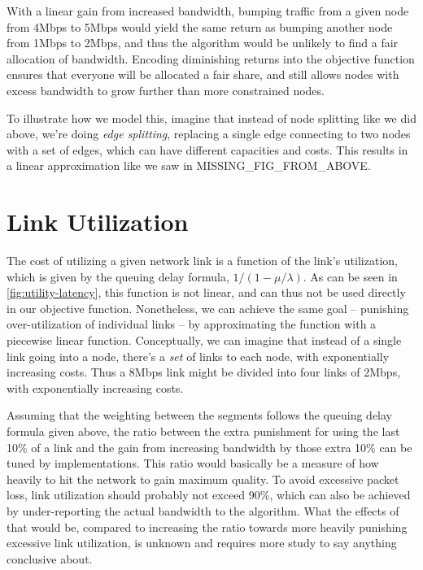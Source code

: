 With a linear gain from increased bandwidth, bumping traffic from a given node from 4Mbps to 5Mbps would yield the same return as bumping another node from 1Mbps to 2Mbps, and thus the algorithm would be unlikely to find a fair allocation of bandwidth. Encoding diminishing returns into the objective function ensures that everyone will be allocated a fair share, and still allows nodes with excess bandwidth to grow further than more constrained nodes.

To illustrate how we model this, imagine that instead of node splitting like we did above, we're doing \emph{edge splitting}, replacing a single edge connecting to two nodes with a set of edges, which can have different capacities and costs. This results in a linear approximation like we saw in MISSING\_FIG\_FROM\_ABOVE.


\section{Link Utilization}

The cost of utilizing a given network link is a function of the link's utilization, which is given by the queuing delay formula, $1/(1 - \mu/\lambda)$. As can be seen in \autoref{fig:utility-latency}, this function is not linear, and can thus not be used directly in our objective function. Nonetheless, we can achieve the same goal -- punishing over-utilization of individual links -- by approximating the function with a piecewise linear function. Conceptually, we can imagine that instead of a single link going into a node, there's a \emph{set} of links to each node, with exponentially increasing costs. Thus a 8Mbps link might be divided into four links of 2Mbps, with exponentially increasing costs.

Assuming that the weighting between the segments follows the queuing delay formula given above, the ratio between the extra punishment for using the last 10\% of a link and the gain from increasing bandwidth by those extra 10\% can be tuned by implementations. This ratio would basically be a measure of how heavily to hit the network to gain maximum quality. To avoid excessive packet loss, link utilization should probably not exceed 90\%, which can also be achieved by under-reporting the actual bandwidth to the algorithm. What the effects of that would be, compared to increasing the ratio towards more heavily punishing excessive link utilization, is unknown and requires more study to say anything conclusive about.

